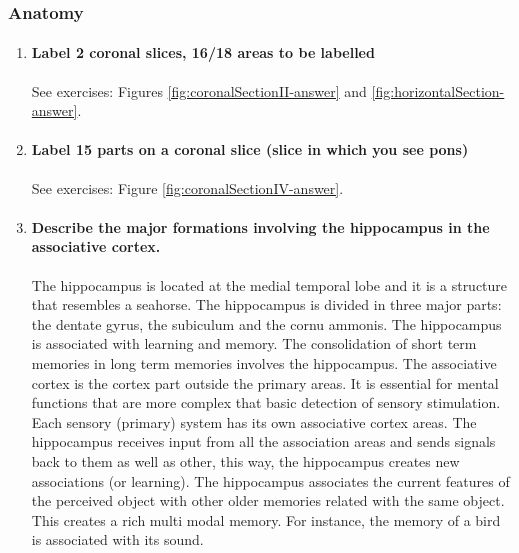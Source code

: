 \documentclass[12pt,article,oneside,a4paper]{memoir}
\begin{document}
\subsubsection{Anatomy}
\begin{enumerate}
\item \paragraph{Label 2 coronal slices, 16/18 areas to be labelled} See exercises: Figures \ref{fig:coronalSectionII-answer} and \ref{fig:horizontalSection-answer}.

\item \paragraph{Label 15 parts on a coronal slice (slice in which you see pons)} See exercises: Figure \ref{fig:coronalSectionIV-answer}.

\item \paragraph{Describe the major formations involving the hippocampus in the associative cortex.} 
The hippocampus is located at the medial temporal lobe and it is a structure that resembles a seahorse. The hippocampus is divided in three major parts: the dentate gyrus, the subiculum and the cornu ammonis. The hippocampus is associated with learning and memory. The consolidation of short term memories in long term memories involves the hippocampus.
The associative cortex is the cortex part outside the primary areas. It is essential for mental functions that are more complex that basic detection of sensory stimulation. Each sensory (primary) system has its own associative cortex areas.
The hippocampus receives input from all the association areas and sends signals back to them as well as other, this way, the hippocampus creates new associations (or learning). The hippocampus associates the current features of the perceived object with other older memories related with the same object. This creates a rich multi modal memory. For instance, the memory of a bird is associated with its sound.


\end{enumerate}
\end{document}
